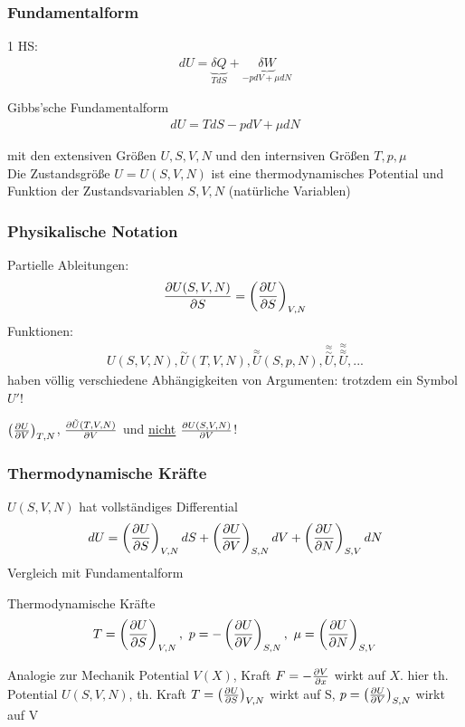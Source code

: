 \subsubsection{Fundamentalform}
1 HS:
\begin{align}
    dU=\underbrace{\delta Q}_{TdS} + \underbrace{\delta W}_{-pdV+\mu dN}
\end{align}
\begin{definition}{Gibbs'sche Fundamentalform}
    \begin{align}
        dU=TdS-pdV+\mu dN
    \end{align}
\end{definition}
mit den extensiven Größen $U,S,V,N$ und den internsiven Größen $T,p,\mu$\\
Die Zustandsgröße $U=U(S,V,N)$ ist eine thermodynamisches Potential und Funktion der Zustandsvariablen $S,V,N$ (natürliche Variablen)


\subsubsection{Physikalische Notation}
Partielle Ableitungen:
\begin{align}
    \frac{\partial U(S,V,N)}{\partial S}=\left(\frac{\partial U}{\partial S}\right)_{V,N}
\end{align}
Funktionen:
\begin{align}
    U(S,V,N),\overset{\sim}{U}(T,V,N),\overset{\approx}{U}(S,p,N),\overset{\approx}{\overset{\sim}{U}},\overset{\approx}{\overset{\approx}{U}},...
\end{align}
haben völlig verschiedene Abhängigkeiten von Argumenten: trotzdem ein Symbol $U'$!

$\left(\frac{\partial U}{\partial V}\right)_{T,N}$, $\frac{\partial \Tilde{U}(T,V,N)}{\partial V}$ und \underline{nicht} $\frac{\partial U(S,V,N)}{\partial V}$!


\subsubsection{Thermodynamische Kräfte}
$U(S,V,N)$ hat vollständiges Differential
\begin{align}
    dU=\left(\frac{\partial U}{\partial S}\right)_{V,N}dS + \left(\frac{\partial U}{\partial V}\right)_{S,N}dV + \left(\frac{\partial U}{\partial N}\right)_{S,V}dN
\end{align}
Vergleich mit Fundamentalform
\begin{definition}{Thermodynamische Kräfte}
    \begin{align}
        T=\left(\pd{U}{S}\right)_{V,N},\ p=-\left(\pd{U}{V}\right)_{S,N},\ \mu=\left(\pd{U}{N}\right)_{S,V}
    \end{align}
\end{definition}
Analogie zur Mechanik Potential $V(X)$, Kraft $F=-\frac{\partial V}{\partial x}$ wirkt auf $X$. hier th. Potential $U(S,V,N)$, th. Kraft $T=\left(\frac{\partial U}{\partial S}\right)_{V,N}$ wirkt auf S, $p=\left(\frac{\partial U}{\partial V}\right)_{S,N}$ wirkt auf V


